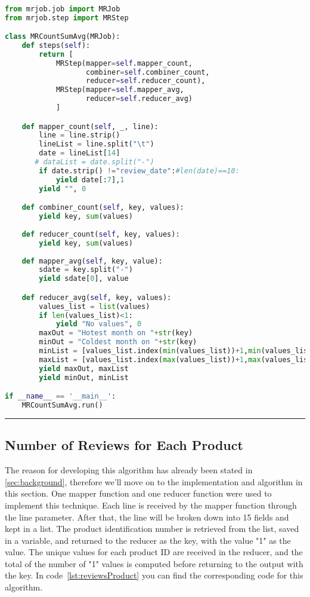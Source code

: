 \renewcommand{\lstlistingname}{Code}
\lstset{style=mystyle}
\begin{lstlisting}[language=Python, caption={Number of Reviews for Each Month}, label={lst:reviewsPerMonth}, mathescape = true, breaklines=true]

from mrjob.job import MRJob
from mrjob.step import MRStep

class MRCountSumAvg(MRJob):
    def steps(self):
        return [
            MRStep(mapper=self.mapper_count,
                   combiner=self.combiner_count,
                   reducer=self.reducer_count),
            MRStep(mapper=self.mapper_avg,
                   reducer=self.reducer_avg)
            ]

    def mapper_count(self, _, line):
        line = line.strip()  
        lineList = line.split("\t")
        date = lineList[14]
       # dataList = date.split("-")
        if date.strip() !="review_date":#len(date)==10:
            yield date[:7],1
        yield "", 0

    def combiner_count(self, key, values):
        yield key, sum(values)
        
    def reducer_count(self, key, values):
        yield key, sum(values)
        
    def mapper_avg(self, key, value):
        sdate = key.split("-")
        yield sdate[0], value

    def reducer_avg(self, key, values):
        values_list = list(values)
        if len(values_list)<1:
            yield "No values", 0
        maxOut = "Hotest month on "+str(key)
        minOut = "Coldest month on "+str(key)
        minList = [values_list.index(min(values_list))+1,min(values_list)]
        maxList = [values_list.index(max(values_list))+1,max(values_list)]
        yield maxOut, maxList
        yield minOut, minList

if __name__ == '__main__':
    MRCountSumAvg.run()

\end{lstlisting}

\rule{200 pt}{0.5 pt} 


\subsection{Number of Reviews for Each Product}
The reason for developing this algorithm has already been stated in \ref{sec:background}, therefore we'll move on to the implementation and algorithm in this section. One mapper function and one reducer function were used to implement this technique. Each line is received by the mapper function through the line parameter. After that, the line will be broken down into 15 fields and kept in a list. The product identification number is retrieved from the list, saved in a variable, and returned to the reducer as the key, with the value "1" as the value. The unique values for each product ID are received in the reducer, and the total of the number of "1" values is computed before returning to the output with the key. In code~\ref{lst:reviewsProduct} you can find the corresponding code for this algorithm.


